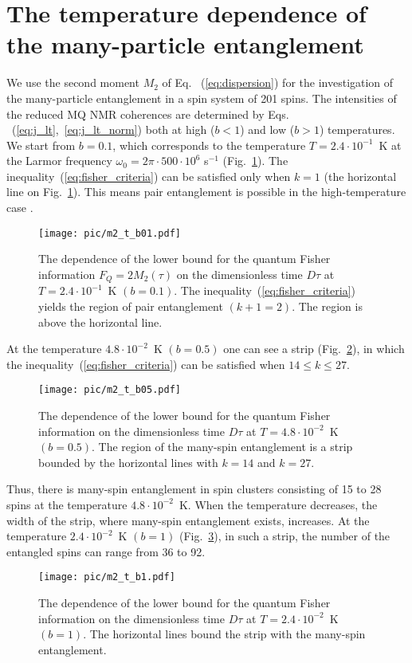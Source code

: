 \section{The temperature dependence of the many-particle entanglement}
\label{sec:entanglement}
We use  the second moment $M_2$ of Eq. ~(\ref{eq:dispersion}) for the investigation of the many-particle entanglement in a spin system of 201 spins. 
The intensities of the reduced MQ NMR coherences are determined by Eqs.  ~(\ref{eq:j_lt},~\ref{eq:j_lt_norm}) both at high ($b < 1$) and low ($b > 1$) temperatures. 
We start from $b = 0.1$, which corresponds to the temperature ${T= 2.4\cdot 10^{-1}}$~K at the Larmor frequency $\omega_0 = 2\pi\cdot 500\cdot10^6$ s$^{-1}$ (Fig.~\ref{fig:m2_t_b01}). 
The inequality~(\ref{eq:fisher_criteria}) can be satisfied only when $k=1$ (the horizontal line on Fig.~\ref{fig:m2_t_b01}). 
This means pair entanglement is possible in the high-temperature case \cite{lab:mq_mnr_qinfo_2012}. \begin{figure}
    \centering
    \texttt{[image: pic/m2\_t\_b01.pdf]}
    \caption{The dependence of the lower bound for the quantum Fisher information $F_Q = 2M_2(\tau)$ on the dimensionless time $D\tau$ at ${T=2.4\cdot10^{-1}}$~K $(b=0.1)$. 
    The inequality~(\ref{eq:fisher_criteria}) yields the region of pair entanglement $(k+1=2)$. The region is above the horizontal line. 
    }
    \label{fig:m2_t_b01}
\end{figure}
\par 
At the temperature ${4.8\cdot10^{-2}}$~K $(b=0.5)$ one can see a strip (Fig.~\ref{fig:m2_t_b05}), in which the inequality~(\ref{eq:fisher_criteria}) can be satisfied when $14 \leq k \leq 27$.
\begin{figure}
    \centering
    \texttt{[image: pic/m2\_t\_b05.pdf]}
    \caption{The dependence of the lower bound for the quantum Fisher information on the dimensionless time $D\tau$ at ${T=4.8\cdot10^{-2}}$~K $(b=0.5)$. The region of the many-spin entanglement is a strip bounded by the horizontal lines with $k=14$ and $k=27$.}
    \label{fig:m2_t_b05}
\end{figure}
Thus, there is many-spin entanglement in spin clusters consisting of 15 to 28 spins at the temperature  ${4.8\cdot10^{-2}}$~K. When the temperature decreases, the width of the strip, where many-spin entanglement exists, increases. At the temperature ${2.4\cdot10^{-2}}$~K $(b=1)$ (Fig.~\ref{fig:m2_t_b1}), in such a strip, the number of the entangled spins can range from 36 to 92.
\begin{figure}
    \centering
    \texttt{[image: pic/m2\_t\_b1.pdf]}
    \caption{The dependence of the lower bound for the quantum Fisher information on the dimensionless time $D\tau$ at ${T=2.4\cdot10^{-2}}$~K $(b=1)$. The horizontal lines bound the strip with the many-spin entanglement.}
    \label{fig:m2_t_b1}
\end{figure}
